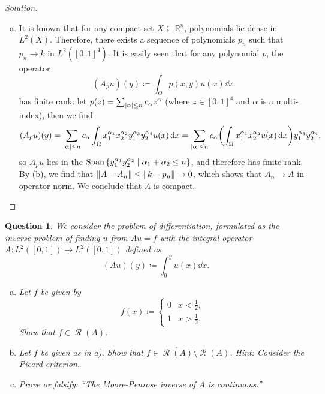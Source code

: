 \documentclass{article}
\theoremstyle{plain}
\newtheorem{question}{Question}
\theoremstyle{remark}
\newenvironment{solution}{\begin{proof}[Solution]\renewcommand\qedsymbol{}}{\end{proof}}
\newcommand{\Bb}{\mathbb}
\newcommand{\Cal}{\mathcal}
\newcommand{\RR}{\Bb R}
\newcommand\ceq\coloneqq %
\newcommand\clos\overline
\DeclareMathOperator{\Span}{Span}
\DeclareMathOperator\Ran{\Cal R}
\begin{document}
\begin{solution}
\begin{enumerate}[(a)]
\item It is known that for any compact set $X \subseteq \RR^n$, polynomials lie dense in $L^2(X)$. Therefore, there exists a sequence of polynomials $p_n$ such that $p_n \to k$ in $L^2([0, 1]^4)$. It is easily seen that for any polynomial $p$, the operator
\[
(A_p u)(y) \ceq \int_\Omega p(x, y) u(x) \dd{x} 
\] 
has finite rank: let $p(z) = \sum_{\abs{\alpha} \leq n} c_\alpha z^\alpha$ (where $z \in [0, 1]^4$ and $\alpha$ is a multi-index), then we find
\[
(A_p u)(y) = \sum_{\abs{\alpha} \leq n} c_\alpha \int_\Omega x_1^{\alpha_1} x_2^{\alpha_2} y_1^{\alpha_3} y_2^{\alpha_4} u(x) \dd{x} = \sum_{\abs{\alpha} \leq n} c_\alpha \qty(\int_\Omega x_1^{\alpha_1} x_2^{\alpha_2} u(x) \dd{x}) y_1^{\alpha_3} y_2^{\alpha_4},
\]
so $A_p u$ lies in the $\Span\qty{y_1^{\alpha_1} y_2^{\alpha_2} \mid \alpha_1 + \alpha_2 \leq n}$, and therefore has finite rank. 
By (b), we find that $\norm{A - A_n} \leq \norm{k - p_n} \to 0$, which shows that $A_n \to A$ in operator norm. We conclude that $A$ is compact. 
	\end{enumerate}
\end{solution}

\begin{question}
	We consider the problem of differentiation, formulated as the inverse problem of finding $u$ from $Au = f$ with the integral operator $A \colon L^2([0, 1]) \to L^2([0, 1])$ defined as
	\[
	(Au)(y) \ceq \int_0^y u(x) \dd{x}.
	\]
	
	\begin{enumerate}[(a)]
		\item Let $f$ be given by
		\[
		f(x) \ceq \begin{cases} 0 & x < \frac12, \\ 1 &x > \frac12. \end{cases}
		\]
		Show that $f \in \clos{\Ran(A)}$. 
		\item Let $f$ be given as in a). Show that $f \in \clos{\Ran(A)} \setminus \Ran(A)$. \emph{Hint: Consider the Picard criterion}. 
		
		\item Prove or falsify: ``The Moore-Penrose inverse of $A$ is continuous.''
	\end{enumerate}
\end{question}
\end{document}
